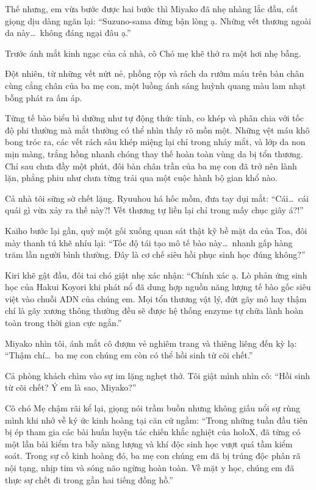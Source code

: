 \documentclass[../main.tex]{subfiles}
\begin{document}
Thế nhưng, em vừa bước được hai bước thì Miyako đã nhẹ nhàng lắc đầu, cất giọng dịu dàng ngăn lại: ``Suzuno-sama đừng bận lòng ạ. Những vết thương ngoài da này\dots\ không đáng ngại đâu ạ.''

Trước ánh mắt kinh ngạc của cả nhà, cô Chó mẹ khẽ thở ra một hơi nhẹ bẫng.

Đột nhiên, từ những vết nứt nẻ, phồng rộp và rách da rướm máu trên bàn chân cùng cẳng chân của ba mẹ con, một luồng ánh sáng huỳnh quang màu lam nhạt bỗng phát ra ấm áp.

Từng tế bào biểu bì dường như tự động thức tỉnh, co khép và phân chia với tốc độ phi thường mà mắt thường có thể nhìn thấy rõ mồn một. Những vệt máu khô bong tróc ra, các vết rách sâu khép miệng lại chỉ trong nháy mắt, và lớp da non mịn màng, trắng hồng nhanh chóng thay thế hoàn toàn vùng da bị tổn thương. Chỉ sau chưa đầy một phút, đôi bàn chân trần của ba mẹ con đã trở nên lành lặn, phẳng phiu như chưa từng trải qua một cuộc hành bộ gian khổ nào.

Cả nhà tôi sững sờ chết lặng. Ryuuhou há hốc mồm, đưa tay dụi mắt: ``Cái\dots\ cái quái gì vừa xảy ra thế này?! Vết thương tự liền lại chỉ trong mấy chục giây á?!''

Kaiho bước lại gần, quỳ một gối xuống quan sát thật kỹ bề mặt da của Toa, đôi mày thanh tú khẽ nhíu lại: ``Tốc độ tái tạo mô tế bào này\dots\ nhanh gấp hàng trăm lần người bình thường. Đây là cơ chế siêu hồi phục sinh học đúng không?''

Kiri khẽ gật đầu, đôi tai chó giật nhẹ xác nhận: ``Chính xác ạ. Lò phản ứng sinh học của Hakui Koyori khi phát nổ đã dung hợp nguồn năng lượng tế bào gốc siêu việt vào chuỗi ADN của chúng em. Mọi tổn thương vật lý, đứt gãy mô hay thậm chí là gãy xương thông thường đều sẽ được hệ thống enzyme tự chữa lành hoàn toàn trong thời gian cực ngắn.''

Miyako nhìn tôi, ánh mắt cô đượm vẻ nghiêm trang và thiêng liêng đến kỳ lạ: ``Thậm chí\dots\ ba mẹ con chúng em còn có thể hồi sinh từ cõi chết.''

Cả phòng khách chìm vào sự im lặng nghẹt thở. Tôi giật mình nhìn cô: ``Hồi sinh từ cõi chết? Ý em là sao, Miyako?''

Cô chó Mẹ chậm rãi kể lại, giọng nói trầm buồn nhưng không giấu nổi sự rùng mình khi nhớ về ký ức kinh hoàng tại căn cứ ngầm: ``Trong những tuần đầu tiên bị ép tham gia các bài huấn luyện tác chiến khắc nghiệt của holoX, đã từng có một lần bài kiểm tra bẫy năng lượng và khí độc sinh học vượt quá tầm kiểm soát. Trong sự cố kinh hoàng đó, ba mẹ con chúng em đã bị trúng độc phân rã nội tạng, nhịp tim và sóng não ngừng hoàn toàn. Về mặt y học, chúng em đã thực sự chết đi trong gần hai tiếng đồng hồ.''
\end{document}
